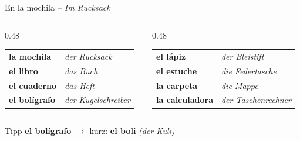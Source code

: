 \documentclass[aspectratio=169, 11pt]{beamer}
\newcommand{\es}[1]{\textbf{\textcolor{spanischrot}{#1}}}
\newcommand{\de}[1]{{\small\textcolor{dunkelgrau}{\textit{#1}}}}
\begin{document}
\begin{frame}{En la mochila \de{-- Im Rucksack}}

\begin{columns}[T]
\begin{column}{0.48\textwidth}
\begin{tabular}{@{}ll@{}}
\es{la mochila} & \de{der Rucksack} \\[0.5em]
\es{el libro} & \de{das Buch} \\[0.5em]
\es{el cuaderno} & \de{das Heft} \\[0.5em]
\es{el bolígrafo} & \de{der Kugelschreiber} \\
\end{tabular}
\end{column}

\begin{column}{0.48\textwidth}
\begin{tabular}{@{}ll@{}}
\es{el lápiz} & \de{der Bleistift} \\[0.5em]
\es{el estuche} & \de{die Federtasche} \\[0.5em]
\es{la carpeta} & \de{die Mappe} \\[0.5em]
\es{la calculadora} & \de{der Taschenrechner} \\
\end{tabular}
\end{column}
\end{columns}

\vspace{1cm}

\begin{block}{Tipp}
\es{el bolígrafo} $\rightarrow$ kurz: \es{el boli} \de{(der Kuli)}
\end{block}

\end{frame}
\end{document}

